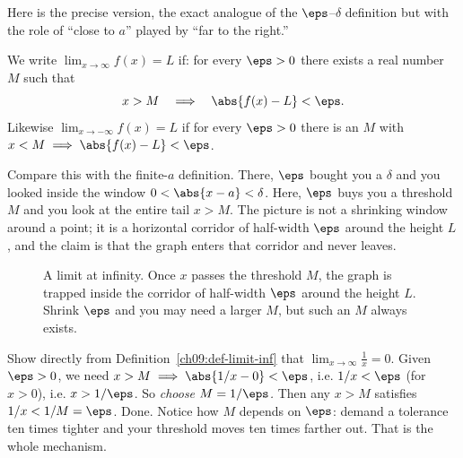 Here is the precise version, the exact analogue of the $\eps$--$\delta$
definition but with the role of ``close to $a$'' played by ``far to the right.''

\begin{definition}
\label{ch09:def-limit-inf}
We write $\displaystyle\lim_{x\to\infty} f(x) = L$ if: for every $\eps > 0$
there exists a real number $M$ such that
\[
   x > M \quad\Longrightarrow\quad \abs{f(x) - L} < \eps .
\]
Likewise $\displaystyle\lim_{x\to-\infty} f(x) = L$ if for every $\eps>0$ there
is an $M$ with $x < M \implies \abs{f(x)-L}<\eps$.
\end{definition}

Compare this with the finite-$a$ definition. There, $\eps$ bought you a $\delta$
and you looked inside the window $0<\abs{x-a}<\delta$. Here, $\eps$ buys you a
threshold $M$ and you look at the entire tail $x>M$. The picture is not a
shrinking window around a point; it is a horizontal corridor of half-width
$\eps$ around the height $L$, and the claim is that the graph enters that
corridor and never leaves.

\begin{figure}[H]
\centering
{}
\caption{A limit at infinity. Once $x$ passes the threshold $M$, the graph is
trapped inside the corridor of half-width $\eps$ around the height $L$. Shrink
$\eps$ and you may need a larger $M$, but such an $M$ always exists.}
\label{ch09:fig-corridor}
\end{figure}

\begin{labbox}
Show directly from Definition~\ref{ch09:def-limit-inf} that
$\lim_{x\to\infty} \tfrac{1}{x} = 0$. Given $\eps>0$, we need $x>M \implies
\abs{1/x - 0} < \eps$, i.e. $1/x < \eps$ (for $x>0$), i.e. $x > 1/\eps$. So
\emph{choose $M = 1/\eps$.} Then any $x>M$ satisfies $1/x < 1/M = \eps$. Done.
Notice how $M$ depends on $\eps$: demand a tolerance ten times tighter and your
threshold moves ten times farther out. That is the whole mechanism.
\end{labbox}

